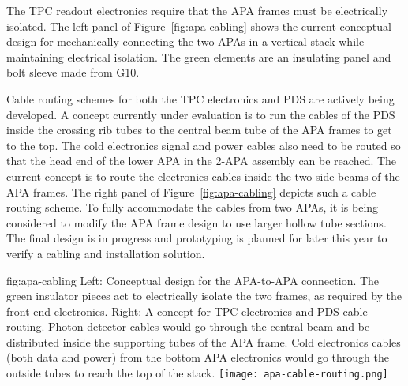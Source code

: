 The TPC readout electronics require that the APA frames must be electrically isolated.  The left panel of Figure~\ref{fig:apa-cabling} shows the current conceptual design for mechanically connecting the two APAs in a vertical stack while maintaining electrical isolation.  The green elements are an insulating panel and bolt sleeve made from G10. 

Cable routing schemes for both the TPC electronics and PDS are actively being developed.  A concept currently under evaluation is to run the cables of the PDS inside the crossing rib tubes to the central beam tube of the APA frames to get to the top.  The cold electronics signal and power cables also need to be routed so that the head end of the lower APA in the 2-APA assembly can be reached. The current concept is to route the electronics cables inside the two side beams of the APA frames. The right panel of Figure~\ref{fig:apa-cabling} depicts such a cable routing scheme. To fully accommodate the cables from two APAs, it is being considered to modify the APA frame design to use larger hollow tube sections. The final design is in progress and prototyping is planned for later this year to verify a cabling and installation solution.     

\begin{dunefigure}{fig:apa-cabling}
{Left: Conceptual design for the APA-to-APA connection.  The green insulator pieces act to electrically isolate the two frames, as required by the front-end electronics.  Right: A concept for TPC electronics and PDS cable routing. Photon detector cables would go through the central beam and be distributed inside the supporting tubes of the APA frame.  Cold electronics cables (both data and power) from the bottom APA electronics would go through the outside tubes to reach the top of the stack.}
\setlength{\fboxsep}{0pt}
\setlength{\fboxrule}{0.5pt}
\qquad \quad
\texttt{[image: apa-cable-routing.png]}
\end{dunefigure}
